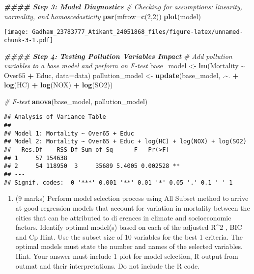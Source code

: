 \documentclass[
]{article}
\newenvironment{Shaded}{\begin{snugshade}}{\end{snugshade}}
\newcommand{\AttributeTok}[1]{\textcolor[rgb]{0.13,0.29,0.53}{#1}}
\newcommand{\CommentTok}[1]{\textcolor[rgb]{0.56,0.35,0.01}{\textit{#1}}}
\newcommand{\DecValTok}[1]{\textcolor[rgb]{0.00,0.00,0.81}{#1}}
\newcommand{\DocumentationTok}[1]{\textcolor[rgb]{0.56,0.35,0.01}{\textbf{\textit{#1}}}}
\newcommand{\FunctionTok}[1]{\textcolor[rgb]{0.13,0.29,0.53}{\textbf{#1}}}
\newcommand{\NormalTok}[1]{#1}
\newcommand{\OtherTok}[1]{\textcolor[rgb]{0.56,0.35,0.01}{#1}}
\newcommand{\SpecialCharTok}[1]{\textcolor[rgb]{0.81,0.36,0.00}{\textbf{#1}}}
\providecommand{\tightlist}{%
  \setlength{\itemsep}{0pt}\setlength{\parskip}{0pt}}
\begin{document}
\begin{Shaded}
\begin{Highlighting}[]
\DocumentationTok{\#\#\#\# Step 3: Model Diagnostics}
\CommentTok{\# Checking for assumptions: linearity, normality, and homoscedasticity}
\FunctionTok{par}\NormalTok{(}\AttributeTok{mfrow=}\FunctionTok{c}\NormalTok{(}\DecValTok{2}\NormalTok{,}\DecValTok{2}\NormalTok{))}
\FunctionTok{plot}\NormalTok{(model)}
\end{Highlighting}
\end{Shaded}

\texttt{[image: Gadham\_23783777\_Atikant\_24051868\_files/figure-latex/unnamed-chunk-3-1.pdf]}

\begin{Shaded}
\begin{Highlighting}[]
\DocumentationTok{\#\#\#\# Step 4: Testing Pollution Variables\textquotesingle{} Impact}
\CommentTok{\# Add pollution variables to a base model and perform an F{-}test}
\NormalTok{base\_model }\OtherTok{\textless{}{-}} \FunctionTok{lm}\NormalTok{(Mortality }\SpecialCharTok{\textasciitilde{}}\NormalTok{ Over65 }\SpecialCharTok{+}\NormalTok{ Educ, }\AttributeTok{data=}\NormalTok{data)}
\NormalTok{pollution\_model }\OtherTok{\textless{}{-}} \FunctionTok{update}\NormalTok{(base\_model, .}\SpecialCharTok{\textasciitilde{}}\NormalTok{. }\SpecialCharTok{+} \FunctionTok{log}\NormalTok{(HC) }\SpecialCharTok{+} \FunctionTok{log}\NormalTok{(NOX) }\SpecialCharTok{+} \FunctionTok{log}\NormalTok{(SO2))}

\CommentTok{\# F{-}test}
\FunctionTok{anova}\NormalTok{(base\_model, pollution\_model)}
\end{Highlighting}
\end{Shaded}

\begin{verbatim}
## Analysis of Variance Table
## 
## Model 1: Mortality ~ Over65 + Educ
## Model 2: Mortality ~ Over65 + Educ + log(HC) + log(NOX) + log(SO2)
##   Res.Df    RSS Df Sum of Sq      F   Pr(>F)   
## 1     57 154638                                
## 2     54 118950  3     35689 5.4005 0.002528 **
## ---
## Signif. codes:  0 '***' 0.001 '**' 0.01 '*' 0.05 '.' 0.1 ' ' 1
\end{verbatim}

\begin{enumerate}
\def\labelenumi{(\alph{enumi})}
\setcounter{enumi}{1}
\tightlist
\item
  (9 marks) Perform model selection process using All Subset method to
  arrive at good regression models that account for variation in
  mortality between the cities that can be attributed to di erences in
  climate and socioeconomic factors. Identify optimal model(s) based on
  each of the adjusted R\^{}2 , BIC and Cp Hint. Use the subset size of
  10 variables for the best 1 criteria. The optimal models must state
  the number and names of the selected variables. Hint. Your answer must
  include 1 plot for model selection, R output from outmat and their
  interpretations. Do not include the R code.
\end{enumerate}
\end{document}
